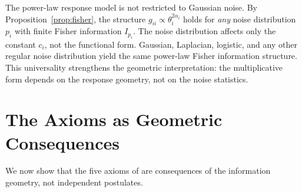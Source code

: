 \documentclass[12pt, a4paper]{article}
\theoremstyle{definition}
\theoremstyle{remark}
\begin{document}
The power-law response model is not restricted to Gaussian noise. By Proposition~\ref{prop:fisher}, the structure $g_{ii} \propto \theta_i^{2\alpha_i}$ holds for \textit{any} noise distribution $p_i$ with finite Fisher information $I_{p_i}$. The noise distribution affects only the constant $c_i$, not the functional form. Gaussian, Laplacian, logistic, and any other regular noise distribution yield the same power-law Fisher information structure. This universality strengthens the geometric interpretation: the multiplicative form depends on the response geometry, not on the noise statistics.

\section{The Axioms as Geometric Consequences}\label{sec:axioms}

We now show that the five axioms of \cite{kirsch2026mc} are consequences of the information geometry, not independent postulates.
\end{document}
